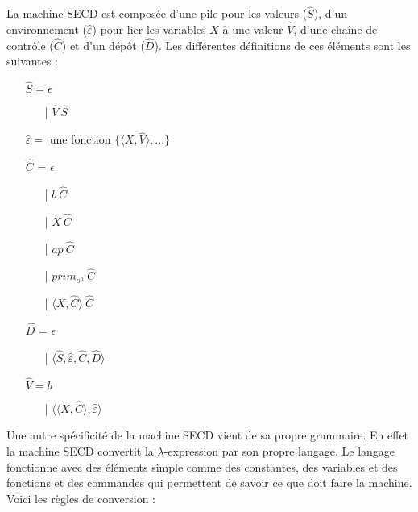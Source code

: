 \documentclass[10pt,a4paper]{article}
\begin{document}
				La machine SECD est composée d'une pile pour les valeurs ($\widehat{S}$), d'un environnement ($\widehat{\varepsilon}$) pour lier les variables $X$ à une valeur $\widehat{V}$, d'une chaîne de contrôle ($\widehat{C}$) et d'un dépôt ($\widehat{D}$). Les différentes définitions de ces éléments sont les suivantes :
				\smallbreak
				\begin{itemize}
					\item[] $\widehat{S} = \epsilon$ 
					\begin{itemize}
						\item[|] $\widehat{V}~\widehat{S}$
					\end{itemize}
					\item[] $\widehat{\varepsilon} =$ une fonction $\{\langle X,\widehat{V}\rangle,...\}$
					\item[] $\widehat{C}$ = $\epsilon$ 
					\begin{itemize}
						\item[|] $b~\widehat{C}$
 						\item[|] $X~\widehat{C}$
						\item[|] $ap~\widehat{C}$
						\item[|] $prim_{o^{n}}~\widehat{C}$
						\item[|] $\langle X,\widehat{C}\rangle~\widehat{C}$
					\end{itemize}
					\item[] $\widehat{D}$ = $\epsilon$
					\begin{itemize}
						\item[|] $\langle\widehat{S},\widehat{\varepsilon},\widehat{C},\widehat{D}\rangle$
					\end{itemize}
					\item[] $\widehat{V} = b$
					\begin{itemize}
						\item[|] $\langle\langle X,\widehat{C}\rangle,\widehat{\varepsilon}\rangle$
					\end{itemize}
				\end{itemize}
				\bigbreak
			
				Une autre spécificité de la machine SECD vient de sa propre grammaire. En effet la machine SECD convertit la $\lambda$-expression par son propre langage. Le langage fonctionne avec des éléments simple comme des constantes, des variables et des fonctions et des commandes qui permettent de savoir ce que doit faire la machine. Voici les règles de conversion :
				\smallbreak
				
\end{document}
